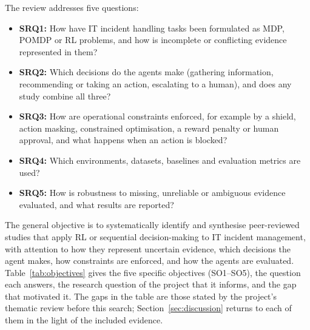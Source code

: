 The review addresses five questions:
\begin{itemize}
\item \textbf{SRQ1:} How have IT incident handling tasks been formulated as MDP, POMDP or RL problems, and how is incomplete or conflicting evidence represented in them?
\item \textbf{SRQ2:} Which decisions do the agents make (gathering information, recommending or taking an action, escalating to a human), and does any study combine all three?
\item \textbf{SRQ3:} How are operational constraints enforced, for example by a shield, action masking, constrained optimisation, a reward penalty or human approval, and what happens when an action is blocked?
\item \textbf{SRQ4:} Which environments, datasets, baselines and evaluation metrics are used?
\item \textbf{SRQ5:} How is robustness to missing, unreliable or ambiguous evidence evaluated, and what results are reported?
\end{itemize}

The general objective is to systematically identify and synthesise peer-reviewed studies that apply RL or sequential decision-making to IT incident management, with attention to how they represent uncertain evidence, which decisions the agent makes, how constraints are enforced, and how the agents are evaluated. Table~\ref{tab:objectives} gives the five specific objectives (SO1--SO5), the question each answers, the research question of the project that it informs, and the gap that motivated it. The gaps in the table are those stated by the project's thematic review before this search; Section~\ref{sec:discussion} returns to each of them in the light of the included evidence.

